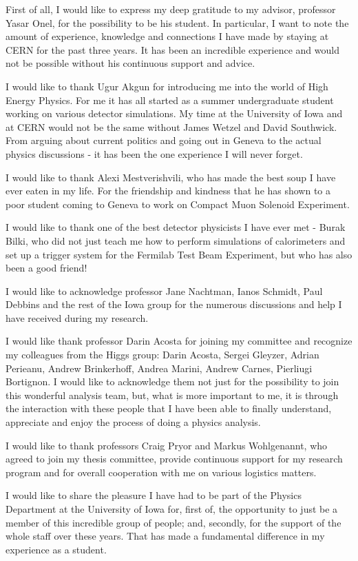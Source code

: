 First of all, I would like to express my deep gratitude to my advisor, professor Yasar Onel, for the possibility to be his student. In particular, I want to note the amount of experience, knowledge and connections I have made by staying at CERN for the past three years. It has been an incredible experience and would not be possible without his continuous support and advice.

I would like to thank Ugur Akgun for introducing me into the world of High Energy Physics. For me it has all started as a summer undergraduate student working on various detector simulations. My time at the University of Iowa and at CERN would not be the same without James Wetzel and David Southwick. From arguing about current politics and going out in Geneva to the actual physics discussions - it has been the one experience I will never forget.

I would like to thank Alexi Mestverishvili, who has made the best soup I have ever eaten in my life. For the friendship and kindness that he has shown to a poor student coming to Geneva to work on Compact Muon Solenoid Experiment.

I would like to thank one of the best detector physicists I have ever met - Burak Bilki, who did not just teach me how to perform simulations of calorimeters and set up a trigger system for the Fermilab Test Beam Experiment, but who has also been a good friend!

I would like to acknowledge professor Jane Nachtman, Ianos Schmidt, Paul Debbins and the rest of the Iowa group for the numerous discussions and help I have received during my research.

I would like thank professor Darin Acosta for joining my committee and recognize my colleagues from the Higgs group: Darin Acosta, Sergei Gleyzer, Adrian Perieanu, Andrew Brinkerhoff, Andrea Marini, Andrew Carnes, Pierliugi Bortignon. I would like to acknowledge them not just for the possibility to join this wonderful analysis team, but, what is more important to me, it is through the interaction with these people that I have been able to finally understand, appreciate and enjoy the process of doing a physics analysis.

I would like to thank professors Craig Pryor and Markus Wohlgenannt, who agreed to join my thesis committee, provide continuous support for my research program and for overall cooperation with me on various logistics matters.

I would like to share the pleasure I have had to be part of the Physics Department at the University of Iowa for, first of, the opportunity to just be a member of this incredible group of people; and, secondly, for the support of the whole staff over these years. That has made a fundamental difference in my experience as a student.

